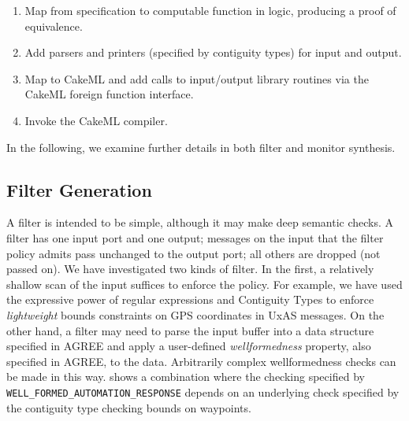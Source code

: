 \begin{enumerate}
\item Map from specification to computable function in logic, producing
a proof of equivalence.
\item Add parsers and printers (specified by contiguity types) for input and output.
\item Map to CakeML and add calls to input/output library routines via
      the CakeML foreign function interface.
\item Invoke the CakeML compiler.
\end{enumerate}


In the following, we examine further details in both filter and
monitor synthesis.

\subsection{Filter Generation}

A filter is intended to be simple, although it may make deep semantic
checks. A filter has one input port and one output; messages on the
input that the filter policy admits pass unchanged to the output port;
all others are dropped (not passed on). We have investigated two kinds
of filter. In the first, a relatively shallow scan of the input
suffices to enforce the policy. For example, we have used the
expressive power of regular expressions and Contiguity
Types \cite{contiguity-types} to enforce \emph{lightweight} bounds
constraints on GPS coordinates in UxAS messages. On the other hand, a
filter may need to parse the input buffer into a data structure
specified in AGREE and apply a user-defined \emph{wellformedness}
property, also specified in AGREE, to the data. Arbitrarily complex
wellformedness checks can be made in this
way.  shows a combination where the checking
specified by {\small\verb+WELL_FORMED_AUTOMATION_RESPONSE+} depends on
an underlying check specified by the contiguity type checking bounds
on waypoints.

